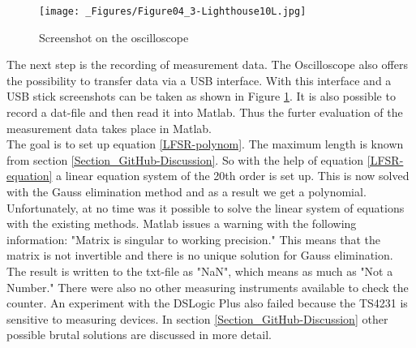 \documentclass[a4paper,twoside, openright,12pt]{report}
\begin{document}
\begin{figure}[h]
\begin{center}
\texttt{[image: \_Figures/Figure04\_3-Lighthouse10L.jpg]}
\caption{Screenshot on the oscilloscope}
\label{Screenshot_Oscilloscope}
\end{center}
\end{figure}
The next step is the recording of measurement data. The Oscilloscope also offers the possibility to transfer data via a USB interface. With this interface and a USB stick screenshots can be taken as shown in Figure \ref{Screenshot_Oscilloscope}. It is also possible to record a dat-file and then read it into Matlab. Thus the furter evaluation of the measurement data takes place in Matlab. \\
The goal is to set up equation \ref{LFSR-polynom}. The maximum length is known from section \ref{Section_GitHub-Discussion}. So with the help of equation \ref{LFSR-equation} a linear equation system of the 20th order is set up. This is now solved with the Gauss elimination method and as a result we get a polynomial. \\
Unfortunately, at no time was it possible to solve the linear system of equations with the existing methods. Matlab issues a warning with the following information: "Matrix is singular to working precision." This means that the matrix is not invertible and there is no unique solution for Gauss elimination. The result is written to the txt-file as "NaN", which means as much as "Not a Number." There were also no other measuring instruments available to check the counter. An experiment with the DSLogic Plus \cite{.f} also failed because the TS4231 is sensitive to measuring devices. \cite{TriadSemiconductor.2016} In section \ref{Section_GitHub-Discussion} other possible brutal solutions are discussed in more detail.
\end{document}

